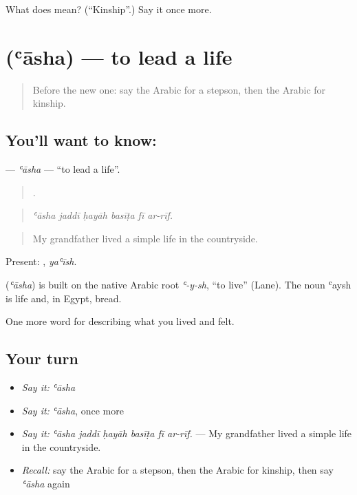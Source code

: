 \begin{tcolorbox}[breakable,colback=teal!4,colframe=teal!35!black,title={Before you move on}]
What does  mean? (\textquotedblleft{}Kinship\textquotedblright{}.) Say it once more.
\end{tcolorbox}
\section[\texorpdfstring{\ar{عاش} (ʿāsha)}{عاش (ʿāsha)}]{ (ʿāsha) — to lead a life}

\label{lesson:AR-C532-asha}



\begin{quote}
Before the new one: say the Arabic for a stepson, then the Arabic for kinship.
\end{quote}

\subsection*{You'll want to know: }
\textbf{} — \emph{ʿāsha} — \textquotedblleft{}to lead a life\textquotedblright{}.

\begin{quote}
     .
\end{quote}

\begin{quote}
\emph{ʿāsha jaddī ḥayāh basīṭa fī ar-rīf.}
\end{quote}

\begin{quote}
My grandfather lived a simple life in the countryside.
\end{quote}

Present: , \emph{yaʿīsh}.

\begin{cousinweb}
\textbf{} (\emph{ʿāsha}) is built on the native Arabic root \emph{ʿ-y-sh}, \textquotedblleft{}to live\textquotedblright{} (Lane). The noun ʿaysh is life and, in Egypt, bread.
\end{cousinweb}

\begin{grammarlens}[title={What you've built}]
One more word for describing what you lived and felt.
\end{grammarlens}

\subsection*{Your turn}
\begin{itemize}
\raggedright
  \item \emph{Say it:} \emph{ʿāsha}
  \item \emph{Say it:} \emph{ʿāsha}, once more
  \item \emph{Say it:} \emph{ʿāsha jaddī ḥayāh basīṭa fī ar-rīf.} — My grandfather lived a simple life in the countryside.
  \item \emph{Recall:} say the Arabic for a stepson, then the Arabic for kinship, then say \emph{ʿāsha} again
\end{itemize}

